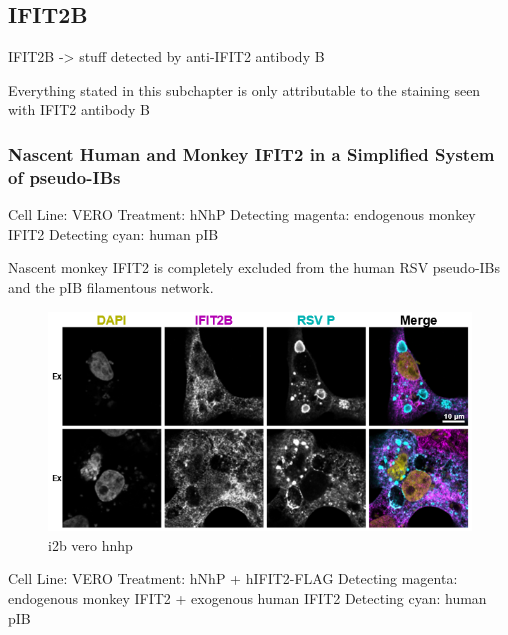 \subsection{IFIT2B} \label{subsec:IFIT2B}
IFIT2B -> stuff detected by anti-IFIT2 antibody B

Everything stated in this subchapter is only attributable to the staining seen with IFIT2 antibody B
\subsubsection{Nascent Human and Monkey IFIT2 in a Simplified System of pseudo-IBs} \label{Nascent Human and Monkey IFIT2 in a Simplified System of pseudo-IBs}
Cell Line: VERO \newline
Treatment: hNhP \newline
Detecting magenta: endogenous monkey IFIT2 \newline
Detecting cyan: human pIB \newline

Nascent monkey IFIT2 is completely excluded from the human RSV pseudo-IBs and the pIB filamentous network.

\begin{figure}
    \centering
    \includegraphics[width=1\linewidth]{10. Chapter 5//Figs//02. I2B/01. i2b vero hnhp.png}
    \caption[i2b vero hnhp]{i2b vero hnhp}
    \label{fig:i2b vero hnhp}
\end{figure}

Cell Line: VERO \newline
Treatment: hNhP + hIFIT2-FLAG \newline
Detecting magenta: endogenous monkey IFIT2 + exogenous human IFIT2 \newline
Detecting cyan: human pIB \newline

